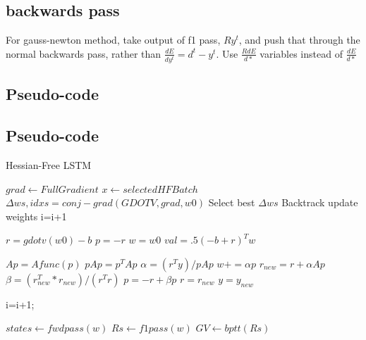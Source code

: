 \documentclass{article}
\begin{document}
\subsection{backwards pass}
For gauss-newton method, take output of f1 pass, $Ry^t$, and push that through the normal backwards pass, rather than $\frac{dE}{dy^t} = d^t - y^t$. Use $\frac{RdE}{d*}$ variables instead of $\frac{dE}{d*}$ 

\subsection{Pseudo-code}

\subsection{Pseudo-code}

\begin{algorithm}
\caption{Hessian-Free LSTM}
\begin{algorithmic}[0]
\State $grad\gets Full Gradient$
\State $x \gets selected HF Batch$
\State $\Delta ws, idxs=conj-grad(GDOTV, grad, w0)$
\State Select best $\Delta ws$
\State Backtrack 
\State update weights
\State i=i+1
\EndWhile
\EndProcedure 


\State $r=gdotv(w0)-b$
\State $p=-r$
\State $w=w0$
\State $val=.5(-b+r)^Tw$

\State $Ap=Afunc(p)$
\State $pAp = p^TAp$ 
\State $\alpha = (r^Ty)/pAp$
\State $w+=\alpha p$
\State $r_{new} = r + \alpha Ap$
\State $\beta = (r_{new}^T*r_{new})/(r^Tr)$
\State $p = -r + \beta p$
\State $r = r_{new}$
\State $y = y_{new}$

\State i=i+1;
\EndWhile
\EndProcedure


\State $states\gets fwdpass(w)$
\State $Rs \gets f1pass(w)$
\State $GV \gets bptt(Rs)$
\EndProcedure


\end{algorithmic}
\end{algorithm}
\end{document}
